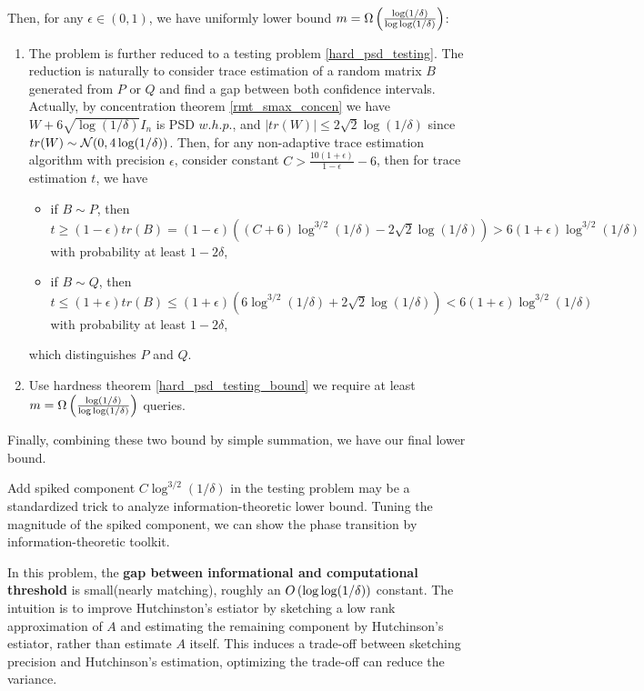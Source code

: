 {\noindent Then, for any $\epsilon\in(0,1)$, we have uniformly lower bound $m=\Omega\left(\frac{\log(1/\delta)}{\log\log(1/\delta)}\right)$:
\begin{enumerate}
    \item The problem is further reduced to a testing problem \ref{hard_psd_testing}.
    The reduction is naturally to consider trace estimation of a random matrix $B$ generated from $P$ or $Q$ and find a gap between both confidence intervals. Actually, by concentration theorem \ref{rmt_smax_concen} we have $W + 6\sqrt{\log(1/\delta)}I_n$ is PSD $w.h.p.$, and $|tr(W)|\le 2\sqrt{2}\log(1/\delta)$ since $tr(W)\sim\mathcal{N}(0,4\log(1/\delta))$. Then, for any non-adaptive trace estimation algorithm with precision $\epsilon$, consider constant $C>\frac{10(1+\epsilon)}{1-\epsilon}-6$, then for trace estimation $t$, we have
    \begin{itemize}
        \item if $B\sim P$, then $t\ge(1-\epsilon)tr(B)=(1-\epsilon)((C+6)\log^{3/2}(1/\delta)-2\sqrt{2}\log(1/\delta))>6(1+\epsilon)\log^{3/2}(1/\delta)$ with probability at least $1-2\delta$,
        \item if $B\sim Q$, then $t\le(1+\epsilon)tr(B)\le(1+\epsilon)(6\log^{3/2}(1/\delta)+2\sqrt{2}\log(1/\delta))<6(1+\epsilon)\log^{3/2}(1/\delta)$ with probability at least $1-2\delta$,
    \end{itemize}
    which distinguishes $P$ and $Q$.
    
    \item Use hardness theorem \ref{hard_psd_testing_bound} we require at least $m=\Omega\left(\frac{\log(1/\delta)}{\log\log(1/\delta)}\right)$ queries. 
\end{enumerate}

\noindent Finally, combining these two bound by simple summation, we have our final lower bound.
}


\begin{rmk}
    Add spiked component $C\log^{3/2}(1/\delta)$ in the testing problem may be a standardized trick to analyze information-theoretic lower bound. Tuning the magnitude of the spiked component, we can show the phase transition by information-theoretic toolkit.
\end{rmk}

In this problem, the \textbf{gap between informational and computational threshold} is small(nearly matching), roughly an $O\left(\log\log(1/\delta)\right)$ constant.
The intuition is to improve Hutchinston's estiator by sketching a low rank approximation of $A$ and estimating the remaining component by Hutchinson’s estiator, rather than estimate $A$ itself. 
This induces a trade-off between sketching precision and Hutchinson’s estimation, optimizing the trade-off can reduce the variance.


